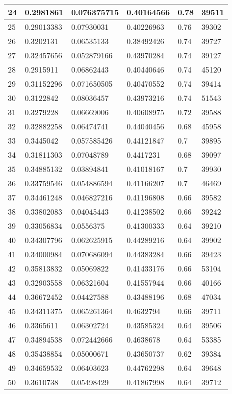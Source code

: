 \begin{longtable}{|l|l|l|l|l|l|}
24 & 0.2981861 & 0.076375715 & 0.40164566 & 0.78 & 39511 \\ \hline 
25 & 0.29013383 & 0.07930031 & 0.40226963 & 0.76 & 39302 \\ \hline 
26 & 0.3202131 & 0.06535133 & 0.38492426 & 0.74 & 39727 \\ \hline 
27 & 0.32457656 & 0.052879166 & 0.43970284 & 0.74 & 39127 \\ \hline 
28 & 0.2915911 & 0.06862443 & 0.40440646 & 0.74 & 45120 \\ \hline 
29 & 0.31152296 & 0.071650505 & 0.40470552 & 0.74 & 39414 \\ \hline 
30 & 0.3122842 & 0.08036457 & 0.43973216 & 0.74 & 51543 \\ \hline 
31 & 0.3279228 & 0.06669006 & 0.40608975 & 0.72 & 39588 \\ \hline 
32 & 0.32882258 & 0.06474741 & 0.44040456 & 0.68 & 45958 \\ \hline 
33 & 0.3445042 & 0.057585426 & 0.44121847 & 0.7 & 39895 \\ \hline 
34 & 0.31811303 & 0.07048789 & 0.4417231 & 0.68 & 39097 \\ \hline 
35 & 0.34885132 & 0.03894841 & 0.41018167 & 0.7 & 39930 \\ \hline 
36 & 0.33759546 & 0.054886594 & 0.41166207 & 0.7 & 46469 \\ \hline 
37 & 0.34461248 & 0.046827216 & 0.41196808 & 0.66 & 39582 \\ \hline 
38 & 0.33802083 & 0.04045443 & 0.41238502 & 0.66 & 39242 \\ \hline 
39 & 0.33056834 & 0.0556375 & 0.41300333 & 0.64 & 39210 \\ \hline 
40 & 0.34307796 & 0.062625915 & 0.44289216 & 0.64 & 39902 \\ \hline 
41 & 0.34000984 & 0.070686094 & 0.44383284 & 0.66 & 39423 \\ \hline 
42 & 0.35813832 & 0.05069822 & 0.41433176 & 0.66 & 53104 \\ \hline 
43 & 0.32903558 & 0.06321604 & 0.41557944 & 0.66 & 40166 \\ \hline 
44 & 0.36672452 & 0.04427588 & 0.43488196 & 0.68 & 47034 \\ \hline 
45 & 0.34311375 & 0.065261364 & 0.4632794 & 0.66 & 39711 \\ \hline 
46 & 0.3365611 & 0.06302724 & 0.43585324 & 0.64 & 39506 \\ \hline 
47 & 0.34894538 & 0.072442666 & 0.4638678 & 0.64 & 53385 \\ \hline 
48 & 0.35438854 & 0.05000671 & 0.43650737 & 0.62 & 39384 \\ \hline 
49 & 0.34659532 & 0.06403623 & 0.44762298 & 0.64 & 39648 \\ \hline 
50 & 0.3610738 & 0.05498429 & 0.41867998 & 0.64 & 39712 \\ \hline 
\end{longtable}